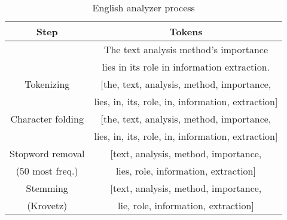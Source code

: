 \begin{table}[tbp]
    \caption{English analyzer process}
    \label{tab:english-analyzer}
    \centering
    \begin{tabular}{|c|c|}
        \toprule
        \textbf{Step} & \textbf{Tokens}\\
        \midrule
        & The text analysis method's importance\\
        & lies in its role in information extraction.\\ 
        \midrule
        Tokenizing & [the, text, analysis, method, importance,\\
        & lies, in, its, role, in, information, extraction]\\
        \midrule
        Character folding & [the, text, analysis, method, importance,\\
        & lies, in, its, role, in, information, extraction]\\
        \midrule
        Stopword removal & [text, analysis, method, importance,\\
        (50 most freq.) & lies, role, information, extraction]\\
        \midrule
        Stemming & [text, analysis, method, importance,\\
        (Krovetz) & lie, role, information, extraction]\\
        \bottomrule
    \end{tabular}
\end{table}
